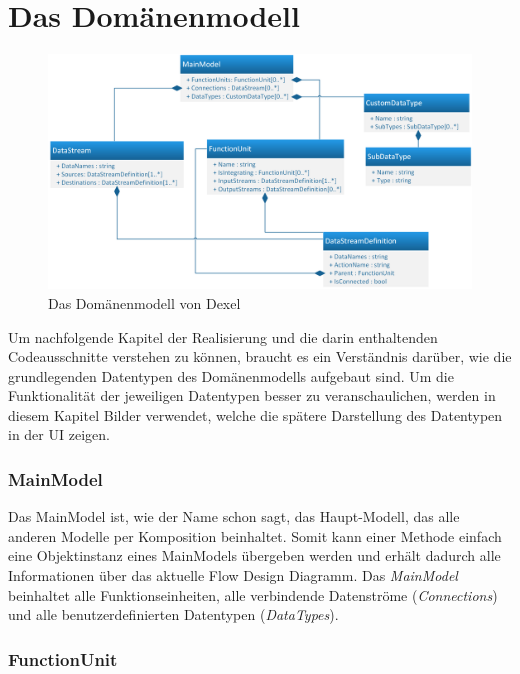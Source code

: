 \section{Das Domänenmodell}

	\begin{figure}[H]
		\centering
		\includegraphics[width=1\linewidth]{./img/ModellUml.png} 
		\caption{Das Domänenmodell von Dexel}
	\end{figure}


Um nachfolgende Kapitel der Realisierung und die darin enthaltenden
Codeausschnitte verstehen zu können, braucht es ein Verständnis darüber, wie die
grundlegenden Datentypen des Domänenmodells aufgebaut sind. Um die Funktionalität der
jeweiligen Datentypen besser zu veranschaulichen, werden in diesem Kapitel
Bilder verwendet, welche die spätere Darstellung des Datentypen in der UI zeigen.

\subsubsection{MainModel}

Das MainModel ist, wie der Name schon sagt, das Haupt-Modell, das alle
anderen Modelle per Komposition beinhaltet. Somit kann einer Methode einfach eine Objektinstanz
eines MainModels übergeben werden und erhält dadurch alle Informationen über das aktuelle Flow Design Diagramm. 
Das \textit{MainModel} beinhaltet alle Funktionseinheiten, alle verbindende
Datenströme (\textit{Connections}) und alle benutzerdefinierten Datentypen (\textit{DataTypes}).

	\subsubsection{FunctionUnit}
	
